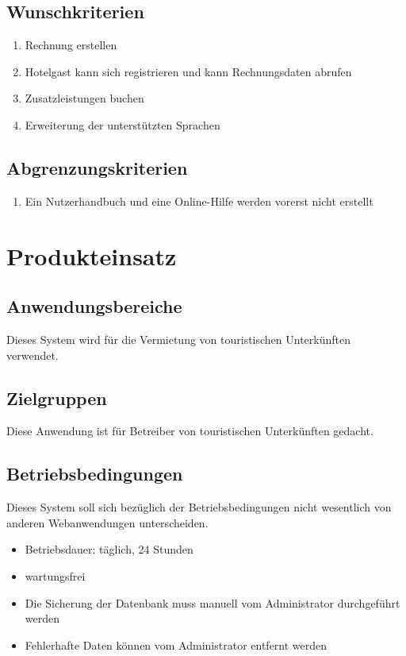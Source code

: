 \documentclass[a4paper,oneside]{scrreprt}
\begin{document}
\section{Wunschkriterien}

\begin{enumerate}
\item Rechnung erstellen
\item Hotelgast kann sich registrieren und kann Rechnungsdaten abrufen
\item Zusatzleistungen buchen
\item Erweiterung der unterstützten Sprachen
\end{enumerate}

\section{Abgrenzungskriterien}
\begin{enumerate}
\item Ein Nutzerhandbuch und eine Online-Hilfe werden vorerst nicht erstellt
\end{enumerate}





\chapter{Produkteinsatz}
\section{Anwendungsbereiche}

Dieses System wird für die Vermietung von touristischen Unterkünften verwendet.


\section{Zielgruppen}

Diese Anwendung ist für Betreiber von touristischen Unterkünften gedacht.

\section{Betriebsbedingungen}
Dieses System soll sich bezüglich der Betriebsbedingungen nicht wesentlich von anderen Webanwendungen unterscheiden.

\begin{itemize}
\item Betriebsdauer: täglich, 24 Stunden
\item wartungsfrei
\item Die Sicherung der Datenbank muss manuell vom Administrator durchgeführt werden
\item Fehlerhafte Daten können vom Administrator entfernt werden
\end{itemize}
\end{document}
